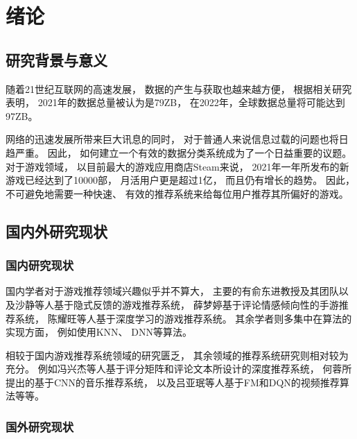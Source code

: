 \section{绪论}

\subsection{研究背景与意义}

随着21世纪互联网的高速发展，
数据的产生与获取也越来越方便，
根据相关研究表明\cite{arnevonseeTotalDataVolume2021}，
2021年的数据总量被认为是79ZB，
在2022年，全球数据总量将可能达到97ZB。

网络的迅速发展所带来巨大讯息的同时，
对于普通人来说信息过载的问题也将日趋严重。
因此，
如何建立一个有效的数据分类系统成为了一个日益重要的议题。
对于游戏领域，
以目前最大的游戏应用商店Steam来说，
2021年一年所发布的新游戏已经达到了10000部\cite{NumberGamesReleased}，
月活用户更是超过1亿，
而且仍有增长的趋势。
因此，
不可避免地需要一种快速、
有效的推荐系统来给每位用户推荐其所偏好的游戏。

\subsection{国内外研究现状}

\subsubsection{国内研究现状}

国内学者对于游戏推荐领域兴趣似乎并不算大，
主要的有俞东进教授及其团队\cite{yuJiYuYinShiFanKuiShuJuDeGeXingHuaYouXiTuiJian2018}以及沙静等人\cite{shaJiYuYinShiFanKuiDeGeXingHuaYouXiTuiJianFangFa2021}基于隐式反馈的游戏推荐系统，
薛梦婷\cite{xieJiYuZhongWenPingLunQingGanQingXiangXingFenXiDeShouYouTuiJianYanJiu2017}基于评论情感倾向性的手游推荐系统，
陈耀旺\cite{chenJiYuShenDuXueXiDeGeXingHuaWangBaYouXiTuiJian2019}等人基于深度学习的游戏推荐系统。
其余学者则多集中在算法的实现方面，
例如使用KNN、
DNN等算法。

相较于国内游戏推荐系统领域的研究匮乏，
其余领域的推荐系统研究则相对较为充分。
例如冯兴杰等人\cite{fengJiYuPingFenJuZhenYuPingLunWenBenDeShenDuTuiJianMoXing2020}基于评分矩阵和评论文本所设计的深度推荐系统，
何蓉\cite{heJiYuJuanJiShenJingWangLuoDeYinLeTuiJianXiTong2019}所提出的基于CNN的音乐推荐系统，
以及吕亚珉\cite{luJiYuFMYuDQNJieHeDeShiPinTuiJianSuanFa2021}等人基于FM和DQN的视频推荐算法等等。

\subsubsection{国外研究现状}

